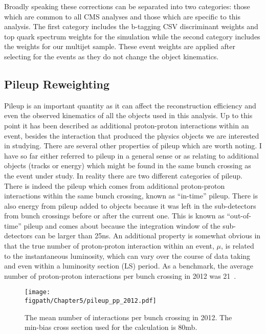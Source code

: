 Broadly speaking these corrections can be separated into two categories: those which are common to all CMS analyses and those which are specific to this analysis.
The first category includes the b-tagging CSV discriminant weights and top quark \pt spectrum weights for the \ttbar simulation while the second category includes the weights for our multijet sample.
These event weights are applied after selecting for the events as they do not change the object kinematics.

\subsection{Pileup Reweighting}

Pileup is an important quantity as it can affect the reconstruction efficiency and even the observed kinematics of all the objects used in this analysis.
Up to this point it has been described as additional proton-proton interactions within an event, besides the interaction that produced the physics objects we are interested in studying.
There are several other properties of pileup which are worth noting.
I have so far either referred to pileup in a general sense or as relating to additional objects (tracks or energy) which might be found in the same bunch crossing as the event under study.
In reality there are two different categories of pileup.
There is indeed the pileup which comes from additional proton-proton interactions within the same bunch crossing, known as ``in-time'' pileup.
There is also energy from pileup added to objects because it was left in the sub-detectors from bunch crossings before or after the current one.
This is known as ``out-of-time'' pileup and comes about because the integration window of the sub-detectors can be larger than 25\unit{ns}.
An additional property is somewhat obvious in that the true number of proton-proton interaction within an event, $\mu$, is related to the instantaneous luminosity, which can vary over the course of data taking and even within a luminosity section (LS) period.
As a benchmark, the average number of proton-proton interactions per bunch crossing in 2012 was 21~\cite{LumiPublic}.

\begin{figure}[!hbt]
    \centering
    \texttt{[image: \\figpath/Chapter5/pileup\_pp\_2012.pdf]}
    \caption{The mean number of interactions per bunch crossing in 2012. The min-bias cross section used for the calculation is 80\unit{mb}.}
    \label{fig:pileup_pp_2012}
\end{figure}

